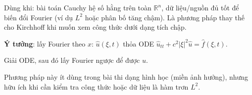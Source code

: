 \begin{dieukienbox}
Dùng khi: bài toán Cauchy hệ số hằng trên toàn $\mathbb{R}^n$,
dữ liệu/nguồn đủ tốt để biến đổi Fourier (ví dụ $L^2$ hoặc phân bố tăng chậm).
Là phương pháp thay thế cho Kirchhoff khi muốn xem công thức dưới dạng tích chập.
\end{dieukienbox}

\begin{nhobox}
\textbf{Ý tưởng}: lấy Fourier theo $x$:
$\hat u(\xi,t)$ thỏa ODE $\hat u_{tt} + c^2|\xi|^2 \hat u = \hat f(\xi,t)$.

Giải ODE, sau đó lấy Fourier ngược để được $u$.
\end{nhobox}

\begin{meobox}
Phương pháp này ít dùng trong bài thi dạng hình học (miền ảnh hưởng),
nhưng hữu ích khi cần kiểm tra công thức hoặc dữ liệu là hàm trơn $L^2$.
\end{meobox}
